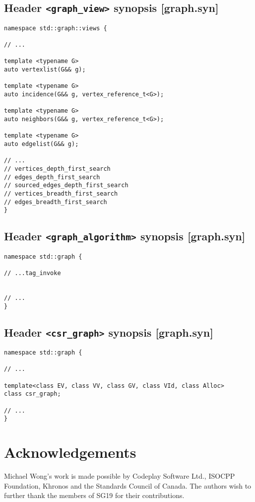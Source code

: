 \documentclass[10pt,onecolumn]{article}
\newcommand{\tcode}[1]{\lstinline[breaklines=true]{#1}}
\begin{document}
\subsection{Header \tcode{<graph_view>} synopsis [graph.syn]}

\begin{lstlisting}
namespace std::graph::views {

// ...

template <typename G>
auto vertexlist(G&& g);

template <typename G>
auto incidence(G&& g, vertex_reference_t<G>);

template <typename G>
auto neighbors(G&& g, vertex_reference_t<G>);

template <typename G>
auto edgelist(G&& g);

// ...
// vertices_depth_first_search
// edges_depth_first_search
// sourced_edges_depth_first_search
// vertices_breadth_first_search
// edges_breadth_first_search
}
\end{lstlisting}

\subsection{Header \tcode{<graph_algorithm>} synopsis [graph.syn]}

\begin{lstlisting}
namespace std::graph {

// ...tag_invoke


// ...
}
\end{lstlisting}

\subsection{Header \tcode{<csr_graph>} synopsis [graph.syn]}

\begin{lstlisting}
namespace std::graph {

// ...

template<class EV, class VV, class GV, class VId, class Alloc>
class csr_graph;

// ...
}
\end{lstlisting}


\section{Acknowledgements}
Michael Wong's work is made possible by Codeplay Software Ltd., ISOCPP Foundation, Khronos and the Standards Council of Canada.  The authors wish to further thank the members of SG19 for their contributions.

\footnotesize


\normalsize
\end{document}

